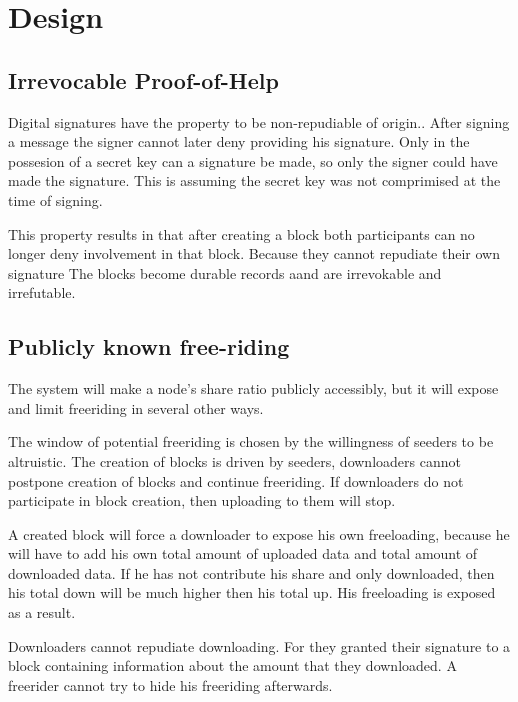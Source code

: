 \chapter{Design}

\section{Irrevocable Proof-of-Help}
Digital signatures have the property to be non-repudiable of origin.\cite{VanderLubbe-crypto}.
After signing a message the signer cannot later deny providing his signature.
Only in the possesion of a secret key can a signature be made,
so only the signer could have made the signature.
This is assuming the secret key was not comprimised at the time of signing.

This property results in that after creating a block
both participants can no longer deny involvement in that block.
Because they cannot repudiate their own signature
The blocks become durable records aand are irrevokable and irrefutable.

\section{Publicly known free-riding}
The system will make a node's share ratio publicly accessibly,
but it will expose and limit freeriding in several other ways.

The window of potential freeriding is chosen by the willingness of seeders to be altruistic.
The creation of blocks is driven by seeders,
downloaders cannot postpone creation of blocks and continue freeriding.
If downloaders do not participate in block creation,
then uploading to them will stop.

A created block will force a downloader to expose his own freeloading,
because he will have to add his own total amount of uploaded data and total amount of downloaded data.
If he has not contribute his share and only downloaded,
then his total down will be much higher then his total up.
His freeloading is exposed as a result.

Downloaders cannot repudiate downloading.
For they granted their signature to a block containing information about the amount that they downloaded.
A freerider cannot try to hide his freeriding afterwards.





